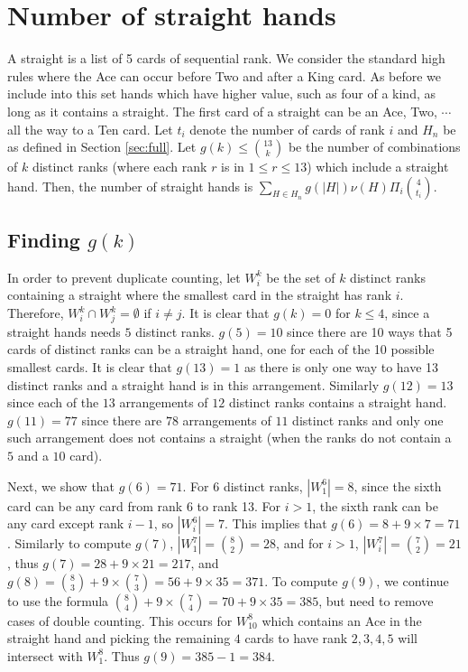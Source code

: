 \documentclass{article}
\begin{document}
\section{Number of straight hands}
\label{sec:straight}
A straight is a list of 5 cards of sequential rank. We consider the standard high rules where the Ace can occur before Two and after a King card.
As before we include into this set hands which have higher value, such as four of a kind, as long as it contains a straight.
The first card of a straight can be an Ace, Two, $\cdots$ all the way to a Ten card.
Let $t_i$ denote the number of cards of rank $i$ and $H_n$ be as defined in Section \ref{sec:full}.
Let $g(k)\leq \binom{13}{k}$ be the number of combinations of $k$ distinct ranks (where each rank $r$ is in $1\leq r\leq 13$) which include a straight hand. 
Then, the number of straight hands is
$\sum_{H\in H_n}g(|H|)\nu(H)\Pi_i\binom{4}{t_i}$.

\subsection{Finding $g(k)$}

In order to prevent duplicate counting, let $W_i^k$ be the set of $k$ distinct ranks containing a straight where the smallest card in the straight has rank $i$. Therefore, $W_i^k\cap W_j^k=\emptyset$ if $i\neq j$.
It is clear that $g(k)=0$ for $k \leq 4$, since a straight hands needs $5$ distinct ranks. $g(5)=10$ since there are 10 ways that 5 cards of distinct ranks can be a straight hand, one for each of the 10 possible smallest cards. It is clear that $g(13)=1$ as there is only one way to have 13 distinct ranks and a straight hand is in this arrangement. Similarly $g(12) = 13$ since each of the $13$ arrangements of $12$ distinct ranks contains a straight hand. $g(11) = 77$ since there are $78$ arrangements of $11$ distinct ranks and only one such arrangement does not contains a straight (when the ranks do not contain a $5$ and a $10$ card).

Next, we show that $g(6)=71$.
For 6 distinct ranks, $|W_1^6|=8$, since the sixth card can be any card from rank 6 to rank 13. 
For $i>1$, the sixth rank can be any card except rank $i-1$, so $|W_i^6|=7$. This implies that $g(6) = 8+9\times 7=71$.
Similarly to compute $g(7)$, $|W_1^7| = \binom{8}{2}=28$, and for $i>1$, $|W_i^7|=\binom{7}{2}=21$, thus $g(7) = 28+9\times 21=217$, and
$g(8)=\binom{8}{3}+9\times\binom{7}{3}=56+9\times 35=371$.
To compute $g(9)$, we continue to use the formula $\binom{8}{4}+9\times\binom{7}{4}=70+9\times 35=385$, but need to remove cases of double counting. This occurs for $W_{10}^8$ which contains an Ace in the straight hand and picking the remaining $4$ cards to have rank $2,3,4,5$ will intersect with $W_1^8$. Thus $g(9) = 385-1=384$.
\end{document}
